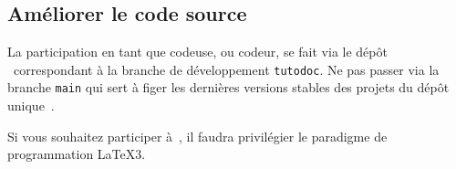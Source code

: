 \documentclass[12pt, a4paper]{tutodoc}
\begin{document}

\subsection{Améliorer le code source}

La participation en tant que codeuse, ou codeur, se fait via le dépôt \thisrepo\ correspondant à la branche de développement \verb#tutodoc#.
Ne pas passer via la branche \verb#main# qui sert à figer les dernières versions stables des projets du dépôt unique \thismonorepo\,.


\begin{tdocimp}
	Si vous souhaitez participer à \thisproj\,, il faudra privilégier le paradigme de programmation \LaTeX3.
\end{tdocimp}
\end{document}
